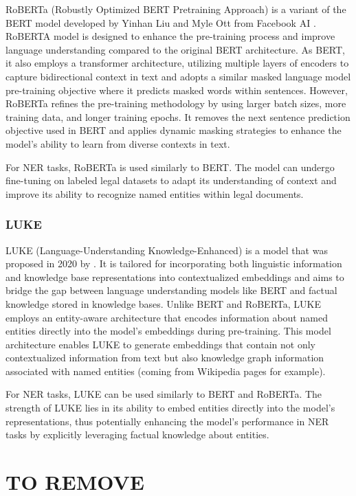 \documentclass{article}
\begin{document}
RoBERTa (Robustly Optimized BERT Pretraining Approach) is a variant of the BERT model developed by Yinhan Liu and  Myle Ott from Facebook AI \cite{ROBERTA}. RoBERTA model is designed to enhance the pre-training process and improve language understanding compared to the original BERT architecture. As BERT, it also employs a transformer architecture, utilizing multiple layers of encoders to capture bidirectional context in text and adopts a similar masked language model pre-training objective where it predicts masked words within sentences. However, RoBERTa refines the pre-training methodology by using larger batch sizes, more training data, and longer training epochs. It removes the next sentence prediction objective used in BERT and applies dynamic masking strategies to enhance the model's ability to learn from diverse contexts in text. 

For NER tasks, RoBERTa is used similarly to BERT. The model can undergo fine-tuning on labeled legal datasets to adapt its understanding of context and improve its ability to recognize named entities within legal documents.
\subsubsection{LUKE}


LUKE (Language-Understanding Knowledge-Enhanced) is a model that was proposed in 2020 by \cite{luke}. It is tailored for incorporating both linguistic information and knowledge base representations into contextualized embeddings and aims to bridge the gap between language understanding models like BERT and factual knowledge stored in knowledge bases. Unlike BERT and RoBERTa, LUKE employs an entity-aware architecture that encodes information about named entities directly into the model's embeddings during pre-training. This model architecture enables LUKE to generate embeddings that contain not only contextualized information from text but also knowledge graph information associated with named entities (coming from Wikipedia pages for example).

For NER tasks, LUKE can be used similarly to BERT and RoBERTa. The strength of LUKE lies in its ability to embed entities directly into the model's representations, thus potentially enhancing the model's performance in NER tasks by explicitly leveraging factual knowledge about entities.



\section{TO REMOVE}
\end{document}
